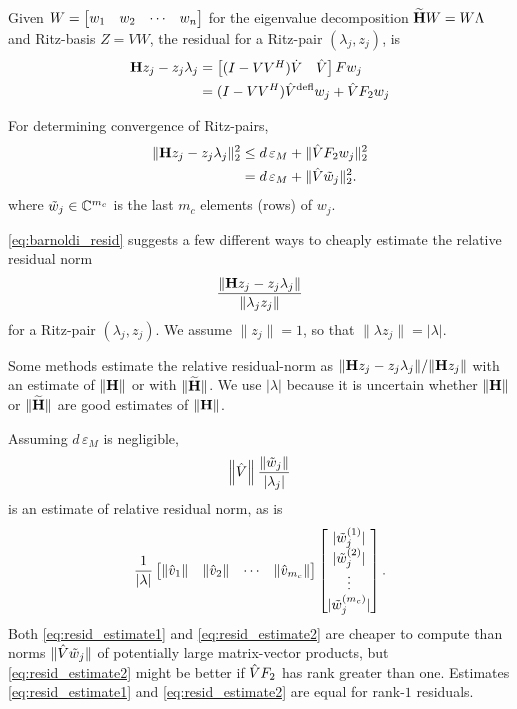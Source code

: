 Given $W=\begin{bmatrix} w_1&w_2&\cdots&w_n\end{bmatrix}$ for the eigenvalue decomposition $\widetilde{\textbf{\textup{H}}} W = W \Lambda$ and Ritz-basis $Z= V W$, the residual  for a Ritz-pair $(\lambda_j,z_j)$, is 
\begin{align*}
\textbf{\textup{H}} z_j - z_j \lambda_j &=\begin{bmatrix} (I-VV^H)\dot{V} & \hat{V}\end{bmatrix}F w_j\\
&= (I-VV^H)\hat{V}^{\text{defl}} w_j +  \hat{V} F_2 w_j
\end{align*}

For determining convergence of Ritz-pairs,
\begin{equation}
\begin{aligned}
\| \textbf{\textup{H}} z_j - z_j \lambda_j \|_2^2  
&\leq d\,\varepsilon_M   + \|  \hat{V} F_2 w_j \|_2^2 \\
&= d\, \varepsilon_M   + \|  \hat{V} \tilde{w}_j \|_2^2.
\end{aligned}
\label{eq:barnoldi_resid}
\end{equation}
where $\tilde{w}_j\in\mathbb{C}^{m_c}$ is the last $m_c$ elements (rows) of $w_j$.

\eqref{eq:barnoldi_resid} suggests a few different ways to cheaply estimate the relative residual norm
\begin{equation}
 \frac{\|\textbf{\textup{H}} z_j - z_j \lambda_j \|}{\|\lambda_j z_j \|} 
\label{eq:rel_resid_def}
\end{equation}
for a Ritz-pair $(\lambda_j,z_j)$.   We assume $\| z_j\|=1$, so that $\| \lambda z_j\| = | \lambda|$.

Some methods estimate the relative residual-norm as $\|\textbf{\textup{H}} z_j - z_j \lambda_j \| / \|\textbf{\textup{H}} z_j\|$ with an estimate of $\| \textbf{\textup{H}} \|$ or with $\| \widetilde{\textbf{\textup{H}}} \|$.    We use $| \lambda|$ because it is uncertain whether  $\| \textbf{\textup{H}} \|$ or $\| \widetilde{\textbf{\textup{H}}} \|$ are good estimates of $\| \textbf{\textup{H}} \|$.

Assuming $d\, \varepsilon_M$ is negligible, 
\begin{equation} 
\left\| \hat{V} \right\|_{}\frac{ \| \tilde{w}_j\|}{| \lambda_j|}
\label{eq:resid_estimate1}
\end{equation}
is an estimate of relative residual norm, as is 
\begin{equation} 
\frac{1}{| \lambda|}
\begin{bmatrix} \|\hat{v}_1\|& \| \hat{v}_2 \| &\cdots& \| \hat{v}_{m_c}\| \end{bmatrix}
\begin{bmatrix} | \tilde{w}_j^{(1)}|\\ |\tilde{w}_j^{(2)}| \\ \vdots \\ | \tilde{w}_j^{(m_c)}| \end{bmatrix}.
\label{eq:resid_estimate2}
\end{equation}
Both \eqref{eq:resid_estimate1} and \eqref{eq:resid_estimate2} are cheaper to compute than norms $\| \hat{V} \tilde{w}_j \|$ of potentially large matrix-vector products, but  \eqref{eq:resid_estimate2}  might be better if $\hat{V} F_2$ has rank greater than one.  Estimates  \eqref{eq:resid_estimate1} and \eqref{eq:resid_estimate2} are equal for rank-$1$ residuals.

